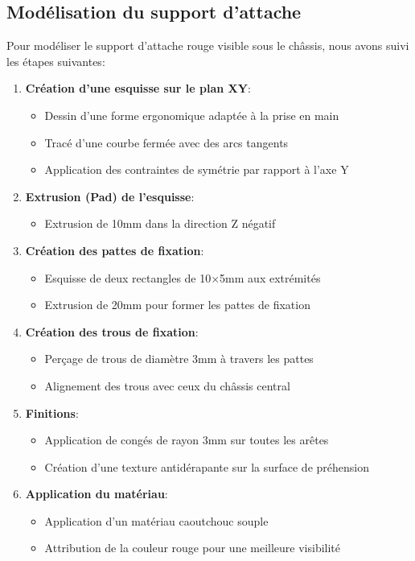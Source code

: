 \documentclass[a4paper,12pt]{report}
\begin{document}
\subsection{Modélisation du support d'attache}
Pour modéliser le support d'attache rouge visible sous le châssis, nous avons suivi les étapes suivantes:
\begin{enumerate}
    \item \textbf{Création d'une esquisse sur le plan XY}:
    \begin{itemize}
        \item Dessin d'une forme ergonomique adaptée à la prise en main
        \item Tracé d'une courbe fermée avec des arcs tangents
        \item Application des contraintes de symétrie par rapport à l'axe Y
    \end{itemize}
    
    \item \textbf{Extrusion (Pad) de l'esquisse}:
    \begin{itemize}
        \item Extrusion de 10mm dans la direction Z négatif
    \end{itemize}
    
    \item \textbf{Création des pattes de fixation}:
    \begin{itemize}
        \item Esquisse de deux rectangles de 10×5mm aux extrémités
        \item Extrusion de 20mm pour former les pattes de fixation
    \end{itemize}
    
    \item \textbf{Création des trous de fixation}:
    \begin{itemize}
        \item Perçage de trous de diamètre 3mm à travers les pattes
        \item Alignement des trous avec ceux du châssis central
    \end{itemize}
    
    \item \textbf{Finitions}:
    \begin{itemize}
        \item Application de congés de rayon 3mm sur toutes les arêtes
        \item Création d'une texture antidérapante sur la surface de préhension
    \end{itemize}
    
    \item \textbf{Application du matériau}:
    \begin{itemize}
        \item Application d'un matériau caoutchouc souple
        \item Attribution de la couleur rouge pour une meilleure visibilité
    \end{itemize}
\end{enumerate}
\end{document}
